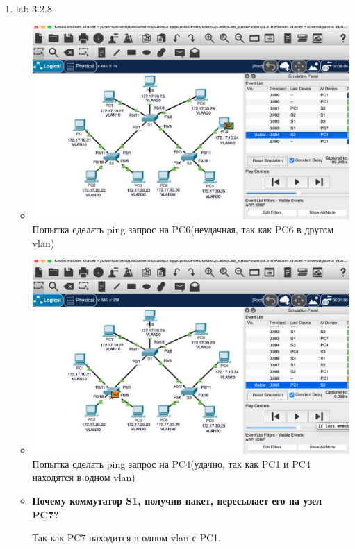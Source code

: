 \documentclass[a4paper,14pt]{extarticle}
\begin{document}
\begin{enumerate}
\begin{itemize}
        \end{itemize}
        \newpage
        \item lab 3.2.8
        \begin{itemize}
            \item 
                \begin{center}
                    \includegraphics[scale=0.4]{pics/3.2.8_1.png}
                    \singlespacing
                    Попытка сделать ping запрос на PC6(неудачная, так как PC6 в другом vlan)
                \end{center}
            \item 
                \begin{center}
                    \includegraphics[scale=0.4]{pics/3.2.8_2.png}
                    \singlespacing
                    Попытка сделать ping запрос на PC4(удачно, так как PC1 и PC4 находятся в одном vlan)
                \end{center}
            \item \textbf{Почему коммутатор S1, получив пакет, пересылает его на узел PC7?}\par
            Так как PC7 находится в одном vlan с PC1.


\end{itemize}
\end{enumerate}
\end{document}
